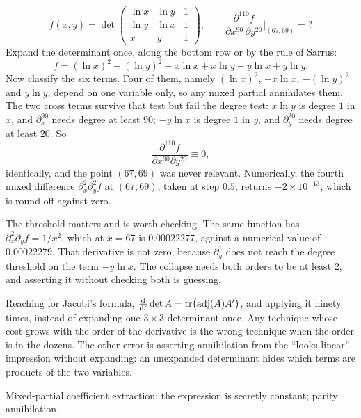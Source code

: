 \begin{worked}
\[
f(x,y)=\det\begin{pmatrix}\ln x&\ln y&1\\[1pt] \ln y&\ln x&1\\[1pt] x&y&1\end{pmatrix},
\qquad \frac{\partial^{110}f}{\partial x^{90}\,\partial y^{20}}\bigg|_{(67,69)}=?
\]
Expand the determinant once, along the bottom row or by the rule of Sarrus:
\[
f=(\ln x)^{2}-(\ln y)^{2}-x\ln x+x\ln y-y\ln x+y\ln y .
\]
Now classify the six terms. Four of them, namely $(\ln x)^{2}$, $-x\ln x$, $-(\ln y)^{2}$ and $y\ln y$, depend on one variable only, so any mixed partial annihilates them. The two cross terms survive that test but fail the degree test: $x\ln y$ is degree $1$ in $x$, and $\partial_{x}^{90}$ needs degree at least $90$; $-y\ln x$ is degree $1$ in $y$, and $\partial_{y}^{20}$ needs degree at least $20$. So
\[
\frac{\partial^{110}f}{\partial x^{90}\partial y^{20}}\equiv 0 ,
\]
identically, and the point $(67,69)$ was never relevant. Numerically, the fourth mixed difference $\partial_{x}^{2}\partial_{y}^{2}f$ at $(67,69)$, taken at step $0.5$, returns $-2\times10^{-13}$, which is round-off against zero.

The threshold matters and is worth checking. The same function has $\partial_{x}^{2}\partial_{y}f=1/x^{2}$, which at $x=67$ is $0.00022277$, against a numerical value of $0.00022279$. That derivative is not zero, because $\partial_{y}^{1}$ does not reach the degree threshold on the term $-y\ln x$. The collapse needs both orders to be at least $2$, and asserting it without checking both is guessing.
\end{worked}

\begin{trap}
Reaching for Jacobi's formula, $\frac{\mathrm{d}}{\mathrm{d}t}\det A=\operatorname{tr}\bigl(\operatorname{adj}(A)A'\bigr)$, and applying it ninety times, instead of expanding one $3\times3$ determinant once. Any technique whose cost grows with the order of the derivative is the wrong technique when the order is in the dozens. The other error is asserting annihilation from the ``looks linear'' impression without expanding: an unexpanded determinant hides which terms are products of the two variables.
\end{trap}

\begin{seealsob}Mixed-partial coefficient extraction; the expression is secretly constant; parity annihilation.\end{seealsob}

